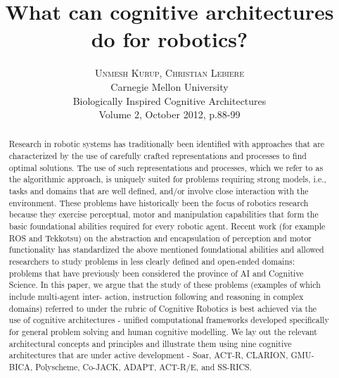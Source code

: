 \documentclass[twoside]{article}
\title{\vspace{-15mm}\fontsize{24pt}{10pt}\selectfont\textbf{
What can cognitive architectures do for robotics?
}} %
\author{
\large
\textsc{Unmesh Kurup, Christian Lebiere}\\[2mm] %
\normalsize Carnegie Mellon University\\ %
\normalsize Biologically Inspired Cognitive Architectures\\
\small Volume 2, October 2012, p.88-99
\vspace{-5mm}
}
\date{}
\begin{document}
\maketitle %

\thispagestyle{fancy} %


\begin{abstract}

\noindent Research in robotic systems has traditionally been identified with approaches that are characterized by the use of carefully crafted representations and processes to find optimal solutions. The use of such representations and processes, which we refer to as the algorithmic approach, is uniquely suited for problems requiring strong models, i.e., tasks and domains that are well defined, and/or involve close interaction with the environment. These problems have historically been the focus of robotics research because they exercise perceptual, motor and manipulation capabilities that form the basic foundational abilities required for every robotic agent. Recent work (for example ROS and Tekkotsu) on the abstraction and encapsulation of perception and motor functionality has standardized the above mentioned foundational abilities and allowed researchers to study problems in less clearly defined and open-ended domains: problems that have previously been considered the province of AI and Cognitive Science. In this paper, we argue that the study of these problems (examples of which include multi-agent inter- action, instruction following and reasoning in complex domains) referred to under the rubric of Cognitive Robotics is best achieved via the use of cognitive architectures - unified computational frameworks developed specifically for general problem solving and human cognitive modelling. We lay out the relevant architectural concepts and principles and illustrate them using nine cognitive architectures that are under active development - Soar, ACT-R, CLARION, GMU-BICA, Polyscheme, Co-JACK, ADAPT, ACT-R/E, and SS-RICS.\cite{Kurup2012}

\end{abstract}

\end{document}
